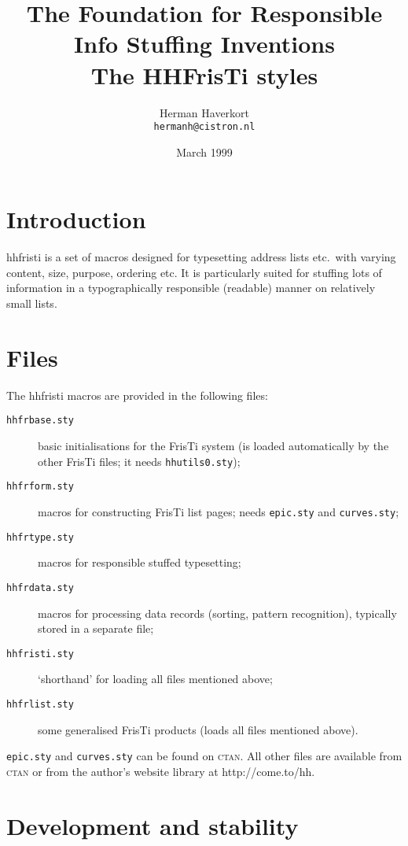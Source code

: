 \documentclass[11pt]{article}
\title{The Foundation for Responsible Info Stuffing Inventions\\The HHFrisTi styles}
\author{Herman Haverkort\\\normalsize\normalfont\texttt{hermanh@cistron.nl}}
\date{March 1999}
\def\packagename#1{{\sffamily #1}}     %
\def\hhfristi{\packagename{hhfristi}\xspace}
\begin{document}
\maketitle

\newpage

\tableofcontents

\newpage

\section{Introduction}

\hhfristi is a set of macros designed for typesetting
address lists etc.\ with varying content, size, purpose, ordering etc.
It is particularly suited for stuffing lots of information in
a typographically responsible (readable) manner on relatively small
lists.

\section{Files}

The \hhfristi macros are provided in the following files:\begin{description}
\item[\texttt{hhfrbase.sty}]   basic initialisations for the FrisTi system
               (is loaded automatically by the other FrisTi files; it needs
               \texttt{hhutils0.sty});
\item[\texttt{hhfrform.sty}]   macros for constructing FrisTi list pages; needs
               \texttt{epic.sty} and \texttt{curves.sty};
\item[\texttt{hhfrtype.sty}]   macros for responsible stuffed typesetting;
\item[\texttt{hhfrdata.sty}]   macros for processing data records (sorting, pattern
               recognition), typically stored in a separate file;
\item[\texttt{hhfristi.sty}]   `shorthand' for loading all files mentioned above;
\item[\texttt{hhfrlist.sty}]   some generalised FrisTi products (loads all files
               mentioned above).
\end{description}

\texttt{epic.sty} and \texttt{curves.sty} can be
found on \textsc{ctan}. All other files are available from
\textsc{ctan} or from the author's website library at http://come.to/hh.

\section{Development and stability}
\end{document}
